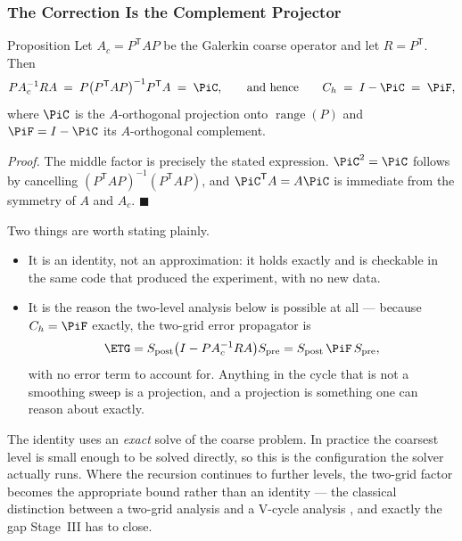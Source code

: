 \frametitle{The Correction Is the Complement Projector}
\footnotesize

\begin{block}{Proposition}
Let $A_c=P^{\mathsf T}AP$ be the Galerkin coarse operator and let $R=P^{\mathsf T}$. Then
\[
PA_c^{-1}RA \;=\; P\bigl(P^{\mathsf T}AP\bigr)^{-1}P^{\mathsf T}A \;=\; \PiC ,
\qquad\text{and hence}\qquad
C_h \;=\; I-\PiC \;=\; \PiF ,
\]
where $\PiC$ is the $A$-orthogonal projection onto $\operatorname{range}(P)$ and
$\PiF=I-\PiC$ its $A$-orthogonal complement.
\end{block}

{\scriptsize\emph{Proof.} The middle factor is precisely the stated expression.
$\PiC^2=\PiC$ follows by cancelling $(P^{\mathsf T}AP)^{-1}(P^{\mathsf T}AP)$, and
$\PiC^{\mathsf T}A=A\PiC$ is immediate from the symmetry of $A$ and $A_c$.
\hfill$\blacksquare$}

\vspace{1.5mm}
Two things are worth stating plainly.
\begin{itemize}
\item It is an \alert{identity, not an approximation}: it holds exactly and is checkable in
the same code that produced the experiment, with no new data.
\item It is the reason the two-level analysis below is possible at all --- because
$C_h=\PiF$ exactly, the two-grid error propagator is
\[
\ETG=S_{\mathrm{post}}\bigl(I-PA_c^{-1}RA\bigr)S_{\mathrm{pre}}
=S_{\mathrm{post}}\,\PiF\,S_{\mathrm{pre}},
\]
with no error term to account for. Anything in the cycle that is not a smoothing sweep is a
projection, and a projection is something one can reason about exactly.
\end{itemize}

\bre
The identity uses an \emph{exact} solve of the coarse problem. In practice the coarsest
level is small enough to be solved directly, so this is the configuration the solver
actually runs. Where the recursion continues to further levels, the two-grid factor becomes
the appropriate bound rather than an identity --- the classical distinction between a
two-grid analysis and a V-cycle analysis \cite{Trottenberg}, and exactly the gap Stage~III
has to close.
\ere
